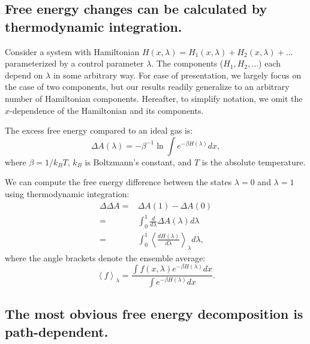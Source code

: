 \documentclass{article}
\begin{document}
\subsection{Free energy changes can be calculated by thermodynamic integration.}

Consider a system with Hamiltonian $H(x, \lambda) = H_1(x, \lambda) + H_2(x, \lambda) + \ldots$ parameterized by a control parameter $\lambda$. The components ($H_1, H_2, \ldots$) each depend on $\lambda$ in some arbitrary way. For ease of presentation, we largely focus on the case of two components, but our results readily generalize to an arbitrary number of Hamiltonian components. Hereafter, to simplify notation, we omit the $x$-dependence of the Hamiltonian and its components.

The excess free energy compared to an ideal gas is:
\begin{equation}\label{eq:dA}
\Delta A(\lambda) = -\beta^{-1} \ln \int e^{-\beta H(\lambda)} dx,
\end{equation}
where $\beta=1/k_BT$, $k_B$ is Boltzmann's constant, and $T$ is the absolute temperature.

We can compute the free energy difference between the states $\lambda=0$ and $\lambda=1$ using thermodynamic integration:
\begin{align}
\Delta\Delta A =& \Delta A(1) - \Delta A(0) \nonumber\\
               =& \int_0^1 \frac{d}{d\lambda} \Delta A(\lambda) d\lambda \nonumber\\
               =& \int_0^1 \left\langle \frac{dH(\lambda)}{d\lambda}\right\rangle_\lambda 
                d\lambda \label{eq:TI},
\end{align}
where the angle brackets denote the ensemble average:
\begin{equation}
\left\langle f \right\rangle_\lambda = \frac
	{\int f(x, \lambda) e^{-\beta H(\lambda)} dx}
    {\int e^{-\beta H(\lambda)} dx}.
\end{equation}




\subsection{The most obvious free energy decomposition is path-dependent.}
\end{document}
